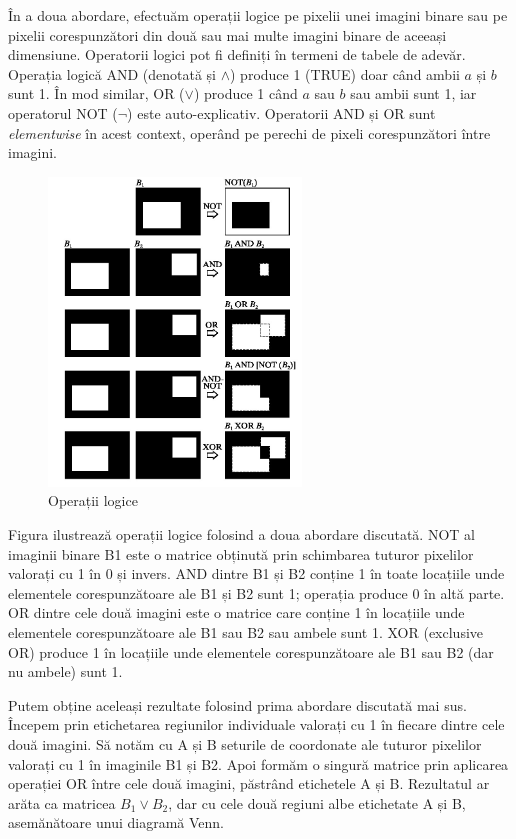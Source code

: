 \documentclass[a4paper,12pt]{report}
\begin{document}
În a doua abordare, efectuăm operații logice pe pixelii unei imagini binare sau pe pixelii corespunzători din două sau mai multe imagini binare de aceeași dimensiune. Operatorii logici pot fi definiți în termeni de tabele de adevăr. Operația logică AND (denotată și $\wedge$) produce 1 (TRUE) doar când ambii $a$ și $b$ sunt 1. În mod similar, OR ($\vee$) produce 1 când $a$ sau $b$ sau ambii sunt 1, iar operatorul NOT ($\neg$) este auto-explicativ. Operatorii AND și OR sunt \textit{elementwise} în acest context, operând pe perechi de pixeli corespunzători între imagini.

\begin{figure}[h!]
    \centering
    \includegraphics[width=0.6\textwidth]{images/logical_operations.jpg}
    \caption{Operații logice}
\end{figure}
\FloatBarrier

Figura ilustrează operații logice folosind a doua abordare discutată. NOT al imaginii binare B1 este o matrice obținută prin schimbarea tuturor pixelilor valorați cu 1 în 0 și invers. AND dintre B1 și B2 conține 1 în toate locațiile unde elementele corespunzătoare ale B1 și B2 sunt 1; operația produce 0 în altă parte. OR dintre cele două imagini este o matrice care conține 1 în locațiile unde elementele corespunzătoare ale B1 sau B2 sau ambele sunt 1. XOR (exclusive OR) produce 1 în locațiile unde elementele corespunzătoare ale B1 sau B2 (dar nu ambele) sunt 1.

Putem obține aceleași rezultate folosind prima abordare discutată mai sus. Începem prin etichetarea regiunilor individuale valorați cu 1 în fiecare dintre cele două imagini. Să notăm cu A și B seturile de coordonate ale tuturor pixelilor valorați cu 1 în imaginile B1 și B2. Apoi formăm o singură matrice prin aplicarea operației OR între cele două imagini, păstrând etichetele A și B. Rezultatul ar arăta ca matricea $B_1 \vee B_2$, dar cu cele două regiuni albe etichetate A și B, asemănătoare unui diagramă Venn.
\end{document}
